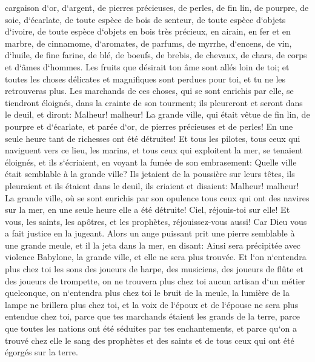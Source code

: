 \verse cargaison d`or, d`argent, de pierres précieuses, de perles, de fin lin, de pourpre, de soie, d`écarlate, de toute espèce de bois de senteur, de toute espèce d`objets d`ivoire, de toute espèce d`objets en bois très précieux, en airain, en fer et en marbre, 
\verse de cinnamome, d`aromates, de parfums, de myrrhe, d`encens, de vin, d`huile, de fine farine, de blé, de boeufs, de brebis, de chevaux, de chars, de corps et d`âmes d`hommes. 
\verse Les fruits que désirait ton âme sont allés loin de toi; et toutes les choses délicates et magnifiques sont perdues pour toi, et tu ne les retrouveras plus. 
\verse Les marchands de ces choses, qui se sont enrichis par elle, se tiendront éloignés, dans la crainte de son tourment; ils pleureront et seront dans le deuil, 
\verse et diront: Malheur! malheur! La grande ville, qui était vêtue de fin lin, de pourpre et d`écarlate, et parée d`or, de pierres précieuses et de perles! En une seule heure tant de richesses ont été détruites! 
\verse Et tous les pilotes, tous ceux qui naviguent vers ce lieu, les marins, et tous ceux qui exploitent la mer, se tenaient éloignés, 
\verse et ils s`écriaient, en voyant la fumée de son embrasement: Quelle ville était semblable à la grande ville? 
\verse Ils jetaient de la poussière sur leurs têtes, ils pleuraient et ils étaient dans le deuil, ils criaient et disaient: Malheur! malheur! La grande ville, où se sont enrichis par son opulence tous ceux qui ont des navires sur la mer, en une seule heure elle a été détruite! 
\verse Ciel, réjouis-toi sur elle! Et vous, les saints, les apôtres, et les prophètes, réjouissez-vous aussi! Car Dieu vous a fait justice en la jugeant. 
\verse Alors un ange puissant prit une pierre semblable à une grande meule, et il la jeta dans la mer, en disant: Ainsi sera précipitée avec violence Babylone, la grande ville, et elle ne sera plus trouvée. 
\verse Et l`on n`entendra plus chez toi les sons des joueurs de harpe, des musiciens, des joueurs de flûte et des joueurs de trompette, on ne trouvera plus chez toi aucun artisan d`un métier quelconque, on n`entendra plus chez toi le bruit de la meule, 
\verse la lumière de la lampe ne brillera plus chez toi, et la voix de l`époux et de l`épouse ne sera plus entendue chez toi, parce que tes marchands étaient les grands de la terre, parce que toutes les nations ont été séduites par tes enchantements, 
\verse et parce qu`on a trouvé chez elle le sang des prophètes et des saints et de tous ceux qui ont été égorgés sur la terre. 

